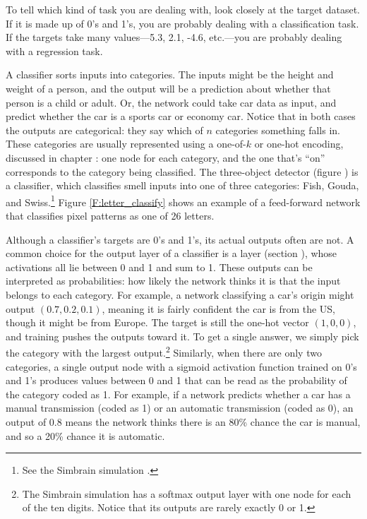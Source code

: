 To tell which kind of task you are dealing with, look closely at the target dataset. If it is made up of 0's and 1's, you are probably dealing with a classification task. If the targets take many values---5.3, 2.1, -4.6, etc.---you are probably dealing with a regression task.

A classifier sorts inputs into categories. The inputs might be the height and weight of a person, and the output will be a prediction about whether that person is a child or adult. Or, the network could take car data as input, and predict whether the car is a sports car or economy car. Notice that in both cases the outputs are categorical: they say which of $n$ categories something falls in. These categories are usually represented using a one-of-$k$ or one-hot encoding, discussed in chapter : one node for each category, and the one that's ``on'' corresponds to the category being classified. The three-object detector (figure ) is a classifier, which classifies smell inputs into one of three categories: Fish, Gouda, and Swiss.\footnote{See the Simbrain simulation .} Figure \ref{F:letter_classify} shows an example of a feed-forward network that classifies pixel patterns as one of 26 letters.

Although a classifier's targets are 0's and 1's, its actual outputs often are not. A common choice for the output layer of a classifier is a  layer (section ), whose activations all lie between 0 and 1 and sum to 1. These outputs can be interpreted as probabilities: how likely the network thinks it is that the input belongs to each category. For example, a network classifying a car's origin might output $(0.7, 0.2, 0.1)$, meaning it is fairly confident the car is from the US, though it might be from Europe. The target is still the one-hot vector $(1,0,0)$, and training pushes the outputs toward it. To get a single answer, we simply pick the category with the largest output.\footnote{The Simbrain simulation  has a softmax output layer with one node for each of the ten digits. Notice that its outputs are rarely exactly 0 or 1.} Similarly, when there are only two categories, a single output node with a sigmoid activation function trained on 0's and 1's produces values between 0 and 1 that can be read as the probability of the category coded as 1. For example, if a network predicts whether a car has a manual transmission (coded as 1) or an automatic transmission (coded as 0), an output of $0.8$ means the network thinks there is an 80\% chance the car is manual, and so a 20\% chance it is automatic.

